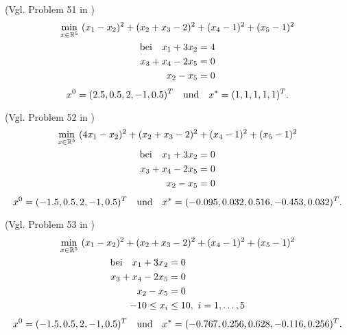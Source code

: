 \begin{testproblem}
(Vgl. Problem 51 in \cite[S.~74]{hock})
\begin{gather}
\min_{x\in\mathbb{R}^5}\ (x_1 - x_2)^2 + (x_2 + x_3 - 2)^2 + (x_4 - 1)^2 + (x_5 - 1)^2 \notag \\
\begin{split}
\text{bei}\quad x_1 + 3 x_2 & = 4 \\
x_3 + x_4 - 2 x_5 & = 0 \\
x_2 - x_5 & = 0 \\
\end{split}
\end{gather}
\begin{equation*}
x^0 = (2.5, 0.5, 2, -1, 0.5)^T \quad\text{und}\quad x^* = (1, 1, 1, 1, 1)^T.
\end{equation*}
\end{testproblem}

\begin{testproblem}
(Vgl. Problem 52 in \cite[S.~75]{hock})
\begin{gather}
\min_{x\in\mathbb{R}^5}\ (4 x_1 - x_2)^2 + (x_2 + x_3 - 2)^2 + (x_4 - 1)^2 + (x_5 - 1)^2 \notag \\
\begin{split}
\text{bei}\quad x_1 + 3 x_2 & = 0 \\
x_3 + x_4 - 2 x_5 & = 0 \\
x_2 - x_5 & = 0 \\
\end{split}
\end{gather}
\begin{equation*}
x^0 = (-1.5, 0.5, 2, -1, 0.5)^T \quad\text{und}\quad x^* = (-0.095, 0.032, 0.516, -0.453, 0.032)^T.
\end{equation*}
\end{testproblem}

\begin{testproblem}
(Vgl. Problem 53 in \cite[S.~76]{hock})
\begin{gather}
\min_{x\in\mathbb{R}^5}\ (x_1 - x_2)^2 + (x_2 + x_3 - 2)^2 + (x_4 - 1)^2 + (x_5 - 1)^2 \notag \\
\begin{split}
\text{bei}\quad x_1 + 3 x_2 & = 0 \\
x_3 + x_4 - 2 x_5 & = 0 \\
x_2 - x_5 & = 0 \\
-10 \leq x_i & \leq 10,\ i = 1,\ldots,5 \\
\end{split}
\end{gather}
\begin{equation*}
x^0 = (-1.5, 0.5, 2, -1, 0.5)^T \quad\text{und}\quad x^* = (-0.767, 0.256, 0.628, -0.116, 0.256)^T.
\end{equation*}
\end{testproblem}

